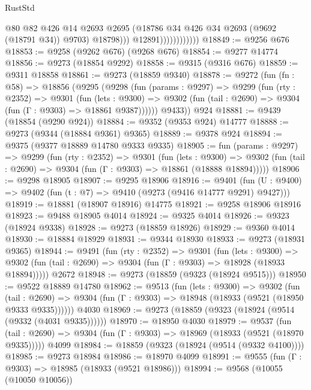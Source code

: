 \begin{lexlean}{RustStd}
\begin{coremodule}
                                  @80
                                  @82
                                  @426
                                  @14
                                  @2693
                                  @2695
                                  (@18786 @34 @426 @34 @2693 (@9692 (@18791 @34)) @9703)
                                  @18798)))
                            @12891))))))))))))
@18849 := @9256 @676
@18853 := @9258 (@9262 @676) (@9268 @676)
@18854 := @9277 @14774
@18856 := @9273 (@18854 @9292)
@18858 := @9315 (@9316 @676)
@18859 := @9311 @18858
@18861 := @9273 (@18859 @9340)
@18878 := @9272
    (fun (fn : @58) =>
    @18856
      (@9295
        (@9298
          (fun (params : @9297) =>
          @9299
            (fun (rty : @2352) =>
            @9301
              (fun (lets : @9300) =>
              @9302 (fun (tail : @2690) => @9304 (fun (Γ : @9303) => @18861 @9387))))))
        @9433))
    @924
@18881 := @9439 (@18854 (@9290 @924))
@18884 := @9352 (@9353 @924) @14777
@18888 := @9273 (@9344 (@18884 @9361) @9365)
@18889 := @9378 @924
@18894 := @9375 (@9377 @18889 @14780 @9333 @9335)
@18905 := fun (params : @9297) =>
  @9299
    (fun (rty : @2352) =>
    @9301
      (fun (lets : @9300) =>
      @9302 (fun (tail : @2690) => @9304 (fun (Γ : @9303) => @18861 (@18888 @18894)))))
@18906 := @9298 @18905
@18907 := @9295 @18906
@18916 := @9401
    (fun (U : @9400) => @9402 (fun (t : @7) => @9410 (@9273 (@9416 @14777 @9291) @9427)))
@18919 := @18881 (@18907 @18916) @14775
@18921 := @9258 @18906 @18916
@18923 := @9488 @18905 @4014
@18924 := @9325 @4014
@18926 := @9323 (@18924 @9338)
@18928 := @9273 (@18859 @18926)
@18929 := @9360 @4014
@18930 := @18884 @18929
@18931 := @9344 @18930
@18933 := @9273 (@18931 @9365)
@18944 := @9491
    (fun (rty : @2352) =>
    @9301
      (fun (lets : @9300) =>
      @9302 (fun (tail : @2690) => @9304 (fun (Γ : @9303) => @18928 (@18933 @18894)))))
    @2672
@18948 := @9273 (@18859 (@9323 (@18924 @9515)))
@18950 := @9522 @18889 @14780
@18962 := @9513
    (fun (lets : @9300) =>
    @9302
      (fun (tail : @2690) =>
      @9304 (fun (Γ : @9303) => @18948 (@18933 (@9521 (@18950 @9333 @9335))))))
    @4030
@18969 := @9273 (@18859 (@9323 (@18924 (@9514 (@9332 (@4031 @9335))))))
@18970 := @18950 @4030
@18979 := @9537
    (fun (tail : @2690) => @9304 (fun (Γ : @9303) => @18969 (@18933 (@9521 (@18970 @9335)))))
    @4099
@18984 := @18859 (@9323 (@18924 (@9514 (@9332 @4100))))
@18985 := @9273 @18984
@18986 := @18970 @4099
@18991 := @9555 (fun (Γ : @9303) => @18985 (@18933 (@9521 @18986)))
@18994 := @9568 (@10055 (@10050 @10056))

\end{coremodule}
\end{lexlean}
